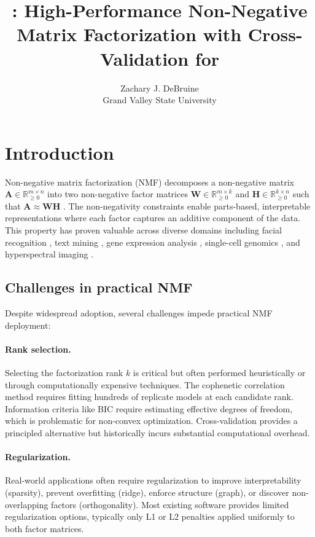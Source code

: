 \documentclass[article]{jss_modified}
\author{Zachary J. DeBruine\\Grand Valley State University}
\title{\pkg{RcppML}: High-Performance Non-Negative Matrix Factorization with 
Cross-Validation for \proglang{R}}
\begin{document}
\section{Introduction} \label{sec:introduction}

Non-negative matrix factorization (NMF) decomposes a non-negative matrix 
$\mathbf{A} \in \mathbb{R}_{\geq 0}^{m \times n}$ into two non-negative factor 
matrices $\mathbf{W} \in \mathbb{R}_{\geq 0}^{m \times k}$ and 
$\mathbf{H} \in \mathbb{R}_{\geq 0}^{k \times n}$ such that 
$\mathbf{A} \approx \mathbf{W}\mathbf{H}$ \citep{Lee1999}. The non-negativity 
constraints enable parts-based, interpretable representations where each factor 
captures an additive component of the data. This property has proven valuable 
across diverse domains including facial recognition \citep{Lee1999}, text mining 
\citep{Xu2003}, gene expression analysis \citep{Brunet2004}, single-cell 
genomics \citep{Kotliar2019}, and hyperspectral imaging \citep{Bioucas2012}.

\subsection{Challenges in practical NMF}

Despite widespread adoption, several challenges impede practical NMF deployment:

\paragraph{Rank selection.} Selecting the factorization rank $k$ is critical 
but often performed heuristically or through computationally expensive 
techniques. The cophenetic correlation method \citep{Brunet2004} requires 
fitting hundreds of replicate models at each candidate rank. Information 
criteria like BIC require estimating effective degrees of freedom, which is 
problematic for non-convex optimization. Cross-validation provides a principled 
alternative but historically incurs substantial computational overhead.

\paragraph{Regularization.} Real-world applications often require regularization 
to improve interpretability (sparsity), prevent overfitting (ridge), enforce 
structure (graph), or discover non-overlapping factors (orthogonality). Most 
existing software provides limited regularization options, typically only L1 or 
L2 penalties applied uniformly to both factor matrices.
\end{document}
